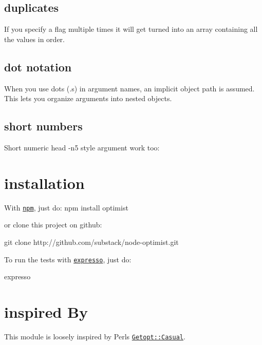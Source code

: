 \subsection*{duplicates }

If you specify a flag multiple times it will get turned into an array containing all the values in order. 


\subsection*{dot notation }

When you use dots ({\ttfamily .}s) in argument names, an implicit object path is assumed. This lets you organize arguments into nested objects. 


\subsection*{short numbers }

Short numeric {\ttfamily head -\/n5} style argument work too\+: 


\section*{installation }

With \href{http://github.com/isaacs/npm}{\tt npm}, just do\+: npm install optimist

or clone this project on github\+: \begin{DoxyVerb}git clone http://github.com/substack/node-optimist.git
\end{DoxyVerb}


To run the tests with \href{http://github.com/visionmedia/expresso}{\tt expresso}, just do\+: \begin{DoxyVerb}expresso
\end{DoxyVerb}


\section*{inspired By }

This module is loosely inspired by Perl\textquotesingle{}s \href{http://search.cpan.org/~photo/Getopt-Casual-0.13.1/Casual.pm}{\tt Getopt\+::\+Casual}. 
